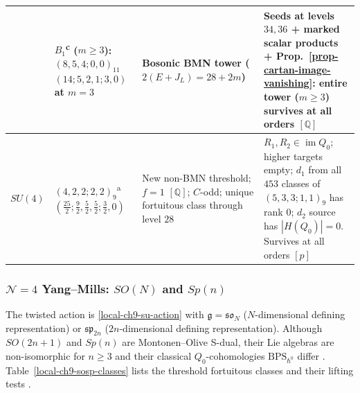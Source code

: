 \documentclass[11pt]{article}
\numberwithin{equation}{section}
\numberwithin{figure}{section}
\numberwithin{table}{section}
\newcommand{\HQ}{|H(Q_0)|}
\begin{document}
{\begin{xltabular}{\linewidth}{|l|>{\raggedright\arraybackslash}p{3.55cm}|>{\raggedright\arraybackslash}X|>{\raggedright\arraybackslash}X|}
 & $B_1$\textsuperscript{c} ($m\ge3$): $(8,5,4;0,0)_{11}$\newline $(14;5,2,1;3,0)$ at $m=3$ & Bosonic BMN tower ($2(E+J_L)=28+2m$) \cite[Section 4.1]{KLLS} & Seeds at levels $34,36$ + marked scalar products + Prop.~\ref{prop-cartan-image-vanishing}: entire tower ($m\ge3$) survives at all orders $[\mathbb Q]$ \cite{Repo}\\
\hline
$SU(4)$ & $(4,2,2;2,2)_9$\textsuperscript{a}\newline $(\tfrac{25}2;\tfrac92,\tfrac52,\tfrac52;\tfrac32,0)$ & New non-BMN threshold; $f=1$ $[\mathbb Q]$; $C$-odd; unique fortuitous class through level $28$ & $R_1,R_2\in\operatorname{im}Q_0$; higher targets empty; $d_1$ from all $453$ classes of $(5,3,3;1,1)_9$ has rank $0$; $d_2$ source has $\HQ=0$. Survives at all orders $[p]$\\
\hline
\end{xltabular}}

\subsubsection{$\mathcal N=4$ Yang--Mills: $SO(N)$ and $Sp(n)$}\label{sec-results-SOSp}

The twisted action is \eqref{local-ch9-su-action} with $\mathfrak g=\mathfrak{so}_N$ ($N$-dimensional defining representation) or $\mathfrak{sp}_{2n}$ ($2n$-dimensional defining representation). Although $SO(2n+1)$ and $Sp(n)$ are Montonen--Olive S-dual, their Lie algebras are non-isomorphic for $n\ge3$ and their classical $Q_0$-cohomologies $\mathrm{BPS}_{\hbar^0}$ differ \cite{ChangLin,GLRT}. Table~\ref{local-ch9-sosp-classes} lists the threshold fortuitous classes and their lifting tests \cite[supplement, Sections S3.1--S3.2]{Repo}.
\end{document}
